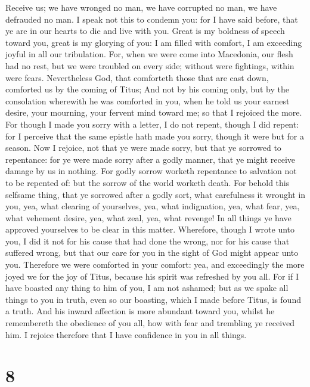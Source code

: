  Receive us; we have wronged no man, we have corrupted no
man, we have defrauded no man.  I speak not this to condemn
you: for I have said before, that ye are in our hearts to die and live
with you.  Great is my boldness of speech toward you, great
is my glorying of you: I am filled with comfort, I am exceeding joyful
in all our tribulation.  For, when we were come into
Macedonia, our flesh had no rest, but we were troubled on every side;
without were fightings, within were fears.  Nevertheless
God, that comforteth those that are cast down, comforted us by the
coming of Titus;  And not by his coming only, but by the
consolation wherewith he was comforted in you, when he told us your
earnest desire, your mourning, your fervent mind toward me; so that I
rejoiced the more.  For though I made you sorry with a
letter, I do not repent, though I did repent: for I perceive that the
same epistle hath made you sorry, though it were but for a season.
 Now I rejoice, not that ye were made sorry, but that ye
sorrowed to repentance: for ye were made sorry after a godly manner,
that ye might receive damage by us in nothing.  For godly
sorrow worketh repentance to salvation not to be repented of: but the
sorrow of the world worketh death.  For behold this
selfsame thing, that ye sorrowed after a godly sort, what carefulness it
wrought in you, yea, what clearing of yourselves, yea, what indignation,
yea, what fear, yea, what vehement desire, yea, what zeal, yea, what
revenge! In all things ye have approved yourselves to be clear in this
matter.  Wherefore, though I wrote unto you, I did it not
for his cause that had done the wrong, nor for his cause that suffered
wrong, but that our care for you in the sight of God might appear unto
you.  Therefore we were comforted in your comfort: yea, and
exceedingly the more joyed we for the joy of Titus, because his spirit
was refreshed by you all.  For if I have boasted any thing
to him of you, I am not ashamed; but as we spake all things to you in
truth, even so our boasting, which I made before Titus, is found a
truth.  And his inward affection is more abundant toward
you, whilst he remembereth the obedience of you all, how with fear and
trembling ye received him.  I rejoice therefore that I have
confidence in you in all things.

\hypertarget{section-7}{%
\section{8}\label{section-7}}

